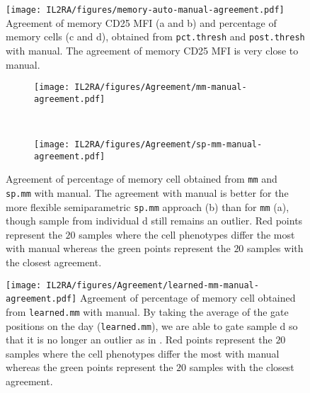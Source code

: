 \begin{figure}[h]
 \centering
 \texttt{[image: IL2RA/figures/memory-auto-manual-agreement.pdf]}
 {Agreement of memory CD25 MFI (a and b) and percentage of memory cells (c and d), obtained from \texttt{pct.thresh} and \texttt{post.thresh} with manual.}
 {
   The agreement of memory CD25 MFI is very close to manual.
 }
\end{figure} 



\begin{figure}[h]
    \begin{subfigure}[b]{.5\textwidth}
        \centering
        \texttt{[image: IL2RA/figures/Agreement/mm-manual-agreement.pdf]}
       \caption{ }
        \label{figure:mm-manual-agreement}
    \end{subfigure}
    ~
    \begin{subfigure}[b]{.5\textwidth}
       \texttt{[image: IL2RA/figures/Agreement/sp-mm-manual-agreement.pdf]}
       \caption{ }
        \label{figure:sp-mm-manual-agreement}
    \end{subfigure}
    {Agreement of percentage of memory cell obtained from \texttt{mm} and \texttt{sp.mm} with manual.}
    {
    The agreement with manual is better for the more flexible semiparametric \texttt{sp.mm} approach (b) than for \texttt{mm} (a),
    though sample from individual d still remains an outlier.
    Red points represent the $20$ samples where the cell phenotypes differ the most with manual 
    whereas the green points represent the $20$ samples with the closest agreement.
    }
\end{figure} 

\begin{figure}[h]
 \centering
 \texttt{[image: IL2RA/figures/Agreement/learned-mm-manual-agreement.pdf]}
 {Agreement of percentage of memory cell obtained from \texttt{learned.mm} with manual.}
 {
 By taking the average of the gate positions on the day (\texttt{learned.mm}), we are able to gate sample d so that it is no longer an outlier
 as in .
 Red points represent the $20$ samples where the cell phenotypes differ the most with manual 
 whereas the green points represent the $20$ samples with the closest agreement.
  }
\end{figure} 

